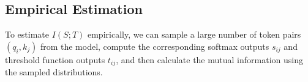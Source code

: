 \subsection{Empirical Estimation}






To estimate \(I(S; T)\) empirically, we can sample a large number of token pairs \((q_i, k_j)\) from the model, compute the corresponding softmax outputs \(s_{ij}\) and threshold function outputs \(t_{ij}\), and then calculate the mutual information using the sampled distributions.













